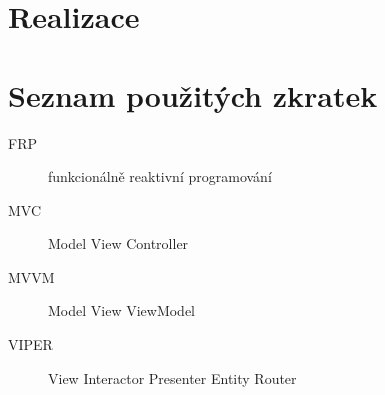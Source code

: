 \documentclass[thesis=M,czech]{FITthesis}[2012/06/26]
\begin{document}
\chapter{Realizace}
\label{chap:realizace}

\begin{conclusion}
\end{conclusion}




\appendix

\chapter{Seznam použitých zkratek}
\begin{description}
	\item[FRP] funkcionálně reaktivní programování
	\item[MVC] Model View Controller
	\item[MVVM] Model View ViewModel
	\item[VIPER] View Interactor Presenter Entity Router
\end{description}
\end{document}
